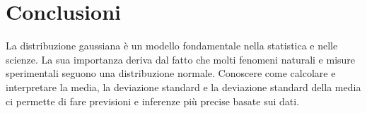 \documentclass{article}
\begin{document}
\section{Conclusioni}
La distribuzione gaussiana è un modello fondamentale nella statistica e nelle scienze. La sua importanza deriva dal fatto che molti fenomeni naturali e misure sperimentali seguono una distribuzione normale. Conoscere come calcolare e interpretare la media, la deviazione standard e la deviazione standard della media ci permette di fare previsioni e inferenze più precise basate sui dati.
\end{document}
